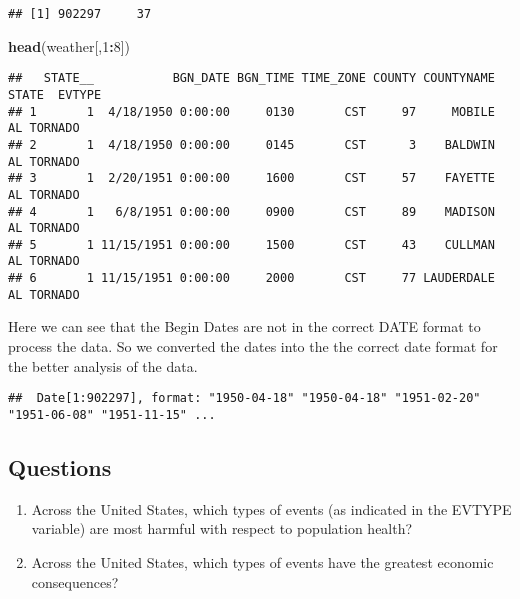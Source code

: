 \documentclass[
]{article}
\newenvironment{Shaded}{\begin{snugshade}}{\end{snugshade}}
\newcommand{\DataTypeTok}[1]{\textcolor[rgb]{0.13,0.29,0.53}{#1}}
\newcommand{\DecValTok}[1]{\textcolor[rgb]{0.00,0.00,0.81}{#1}}
\newcommand{\KeywordTok}[1]{\textcolor[rgb]{0.13,0.29,0.53}{\textbf{#1}}}
\newcommand{\NormalTok}[1]{#1}
\newcommand{\OperatorTok}[1]{\textcolor[rgb]{0.81,0.36,0.00}{\textbf{#1}}}
\newcommand{\StringTok}[1]{\textcolor[rgb]{0.31,0.60,0.02}{#1}}
\begin{document}
\begin{verbatim}
## [1] 902297     37
\end{verbatim}

\begin{Shaded}
\begin{Highlighting}[]
\KeywordTok{head}\NormalTok{(weather[,}\DecValTok{1}\OperatorTok{:}\DecValTok{8}\NormalTok{])}
\end{Highlighting}
\end{Shaded}

\begin{verbatim}
##   STATE__           BGN_DATE BGN_TIME TIME_ZONE COUNTY COUNTYNAME STATE  EVTYPE
## 1       1  4/18/1950 0:00:00     0130       CST     97     MOBILE    AL TORNADO
## 2       1  4/18/1950 0:00:00     0145       CST      3    BALDWIN    AL TORNADO
## 3       1  2/20/1951 0:00:00     1600       CST     57    FAYETTE    AL TORNADO
## 4       1   6/8/1951 0:00:00     0900       CST     89    MADISON    AL TORNADO
## 5       1 11/15/1951 0:00:00     1500       CST     43    CULLMAN    AL TORNADO
## 6       1 11/15/1951 0:00:00     2000       CST     77 LAUDERDALE    AL TORNADO
\end{verbatim}

Here we can see that the Begin Dates are not in the correct DATE format
to process the data. So we converted the dates into the the correct date
format for the better analysis of the data.

\begin{Shaded}
\end{Shaded}

\begin{verbatim}
##  Date[1:902297], format: "1950-04-18" "1950-04-18" "1951-02-20" "1951-06-08" "1951-11-15" ...
\end{verbatim}

\hypertarget{questions}{%
\subsection{Questions}\label{questions}}

\begin{enumerate}
\def\labelenumi{\arabic{enumi}.}
\item
  Across the United States, which types of events (as indicated in the
  EVTYPE variable) are most harmful with respect to population health?
\item
  Across the United States, which types of events have the greatest
  economic consequences?
\end{enumerate}
\end{document}
